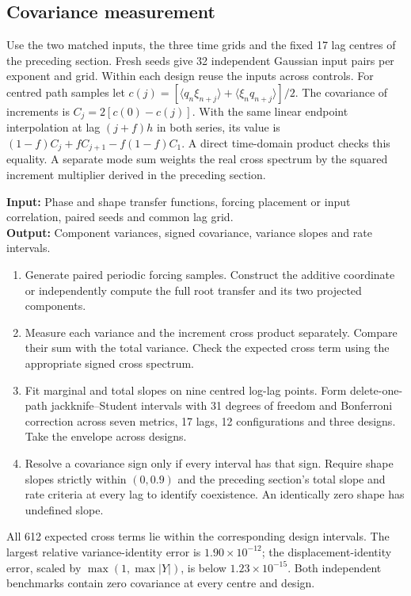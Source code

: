\documentclass[11pt]{article}
\begin{document}
\subsection{Covariance measurement}
Use the two matched inputs, the three time grids and the fixed 17 lag
centres of the preceding section. Fresh seeds give 32 independent Gaussian
input pairs per exponent and grid. Within each design reuse the inputs
across controls. For centred path samples let
\(c(j)=[\langle q_n\xi_{n+j}\rangle+\langle\xi_nq_{n+j}\rangle]/2\).
The covariance of increments is \(C_j=2[c(0)-c(j)]\). With the same linear
endpoint interpolation at lag \((j+f)h\) in both series, its value is
\((1-f)C_j+fC_{j+1}-f(1-f)C_1\). A direct time-domain product checks
this equality. A separate mode sum weights the real cross spectrum by the
squared increment multiplier derived in the preceding section.

\begin{algorithm}[htbp]
\caption{Comparing signed covariance with the observed-root variance}
\small\textbf{Input:} Phase and shape transfer functions, forcing placement or input correlation, paired seeds and common lag grid.\\
\textbf{Output:} Component variances, signed covariance, variance slopes and rate intervals.
\begin{enumerate}\setlength{\itemsep}{.1em}
\item Generate paired periodic forcing samples. Construct the additive coordinate or independently compute the full root transfer and its two projected components.
\item Measure each variance and the increment cross product separately. Compare their sum with the total variance. Check the expected cross term using the appropriate signed cross spectrum.
\item Fit marginal and total slopes on nine centred log-lag points. Form delete-one-path jackknife--Student intervals with 31 degrees of freedom and Bonferroni correction across seven metrics, 17 lags, 12 configurations and three designs. Take the envelope across designs.
\item Resolve a covariance sign only if every interval has that sign. Require shape slopes strictly within \((0,0.9)\) and the preceding section's total slope and rate criteria at every lag to identify coexistence. An identically zero shape has undefined slope.
\end{enumerate}
\end{algorithm}
All 612 expected cross terms lie within the corresponding design intervals.
The largest relative variance-identity error is \(1.90\times10^{-12}\);
the displacement-identity error, scaled by \(\max(1,\max|Y|)\), is below
\(1.23\times10^{-15}\). Both independent benchmarks contain zero covariance
at every centre and design.
\end{document}
